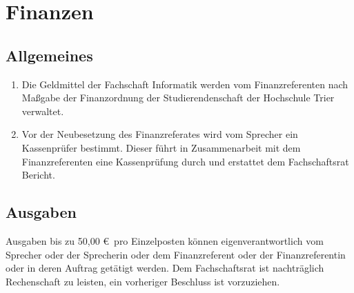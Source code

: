 \section{Finanzen}
\subsection{Allgemeines}
\begin{enumerate}
	\item Die Geldmittel der Fachschaft Informatik werden vom Finanzreferenten nach Maßgabe der Finanzordnung der Studierendenschaft der Hochschule Trier verwaltet.
	\item Vor der Neubesetzung des Finanzreferates wird vom Sprecher ein Kassenprüfer bestimmt. Dieser führt in Zusammenarbeit mit dem Finanzreferenten eine Kassenprüfung durch und erstattet dem Fachschaftsrat Bericht.
\end{enumerate}

\subsection{Ausgaben}
Ausgaben bis zu 50,00 \euro~pro Einzelposten können eigenverantwortlich vom Sprecher oder der Sprecherin oder dem Finanzreferent oder der Finanzreferentin oder in deren Auftrag getätigt werden. Dem Fachschaftsrat ist nachträglich Rechenschaft zu leisten, ein vorheriger Beschluss ist vorzuziehen.
